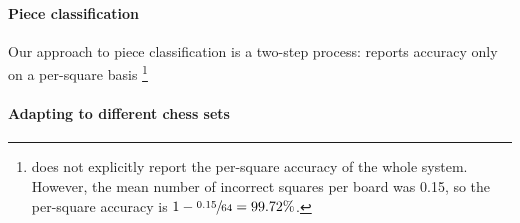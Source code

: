 \documentclass[../main.tex]{subfiles}
\begin{document}
\paragraph{Piece classification}
Our approach to piece classification is a two-step process:
\cite{mehta2020} reports accuracy only on a per-square basis
\footnote{
     does not explicitly report the per-square accuracy of the whole system.
    However, the mean number of incorrect squares per board was 0.15, so the per-square accuracy is $1-\sfrac{0.15}{64}=99.72\%$.
}

\paragraph{Adapting to different chess sets}

\ifSubfilesClassLoaded{%
\printglossary[type=\acronymtype]%
\printbibliography%
}{}%
\end{document}
